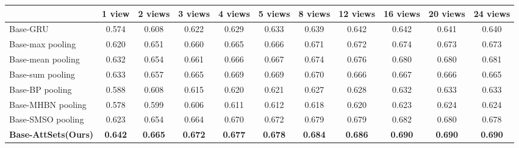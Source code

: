 \documentclass[twocolumn]{svjour3}    \pdfoutput=1
\newcommand{\nickname}{AttSets}
\begin{document}
\begin{table*}[t]
\caption{ Group 1: mean IoU for multi-view reconstruction of all 13 categories in ShapeNet testing split. All networks are firstly trained given only 1 image for each object in Stage 1. The \nickname{} module is further trained given \textbf{2 images} per object in Stage 2, while other competing approaches are fine-tuned given \textbf{2 images} per object in Stage 2.}
\centering
\label{tab:iou_r2n2_02v}
\tabcolsep=0.125cm
\begin{tabular}{ l|cccccccccc}
\hline
&1 view&2 views&3 views& 4 views&5 views&8 views&12 views&16 views&20 views&24 views \\
\hline
Base-GRU &0.574&0.608&0.622&0.629&0.633&0.639&0.642&0.642&0.641&0.640 \\
Base-max pooling &0.620&0.651&0.660&0.665&0.666&0.671&0.672&0.674&0.673&0.673 \\
Base-mean pooling &0.632&0.654&0.661&0.666&0.667&0.674&0.676&0.680&0.680&0.681 \\
Base-sum pooling &0.633&0.657&0.665&0.669&0.669&0.670&0.666&0.667&0.666&0.665 \\
Base-BP pooling &0.588&0.608&0.615&0.620&0.621&0.627&0.628&0.632&0.633&0.633 \\
Base-MHBN pooling &0.578&0.599&0.606&0.611&0.612&0.618&0.620&0.623&0.624&0.624 \\
Base-SMSO pooling &0.623&0.654&0.664&0.670&0.672&0.679&0.679&0.682&0.680&0.678 \\
\textbf{Base-\nickname{}(Ours)} &\textbf{0.642}&\textbf{0.665}&\textbf{0.672}&\textbf{0.677}&\textbf{0.678}&\textbf{0.684}
&\textbf{0.686}&\textbf{0.690}&\textbf{0.690}&\textbf{0.690} \\
\hline
\end{tabular}
\vspace{-0.1 cm}
\end{table*}
\end{document}
